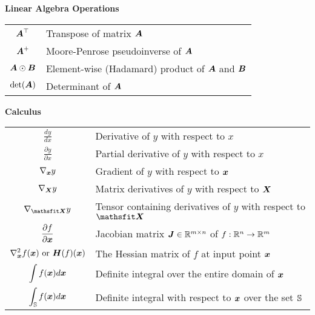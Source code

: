 \vspace{\notationgap}
\begin{minipage}{\textwidth}
	\centerline{\bf Linear Algebra Operations}
	\bgroup
	\def\arraystretch{1.5}
	\begin{tabular}{cp{3.25in}}
		$\displaystyle {\bm{A}}^\top$ & Transpose of matrix ${\bm{A}}$ \\
		$\displaystyle {\bm{A}}^+$ & Moore-Penrose pseudoinverse of ${\bm{A}}$\\
		$\displaystyle {\bm{A}} \odot {\bm{B}} $ & Element-wise (Hadamard) product of ${\bm{A}}$ and ${\bm{B}}$ \\
		$\displaystyle \mathrm{det}({\bm{A}})$ & Determinant of ${\bm{A}}$ \\
	\end{tabular}
	\egroup
\end{minipage}

\vspace{\notationgap}
\begin{minipage}{\textwidth}
	\centerline{\bf Calculus}
	\bgroup
	\def\arraystretch{1.5}
	\begin{tabular}{cp{3.25in}}
		$\displaystyle\frac{d y} {d x}$ & Derivative of $y$ with respect to $x$\\ [2ex]
		$\displaystyle \frac{\partial y} {\partial x} $ & Partial derivative of $y$ with respect to $x$ \\
		$\displaystyle \nabla_{\bm{x}} y $ & Gradient of $y$ with respect to ${\bm{x}}$ \\
		$\displaystyle \nabla_{\bm{X}} y $ & Matrix derivatives of $y$ with respect to ${\bm{X}}$ \\
		$\displaystyle \nabla_\tX y $ & Tensor containing derivatives of $y$ with respect to $\tX$ \\
		$\displaystyle \frac{\partial f}{\partial {\bm{x}}} $ & Jacobian matrix ${\bm{J}} \in \mathbb{R}^{m\times n}$ of $f: \mathbb{R}^n \rightarrow \mathbb{R}^m$\\
		$\displaystyle \nabla_{\bm{x}}^2 f({\bm{x}})\text{ or }{\bm{H}}( f)({\bm{x}})$ & The Hessian matrix of $f$ at input point ${\bm{x}}$\\
		$\displaystyle \int f({\bm{x}}) d{\bm{x}} $ & Definite integral over the entire domain of ${\bm{x}}$ \\
		$\displaystyle \int_{\mathbb{S}} f({\bm{x}}) d{\bm{x}}$ & Definite integral with respect to ${\bm{x}}$ over the set ${\mathbb{S}}$ \\
	\end{tabular}
	\egroup
\end{minipage}

